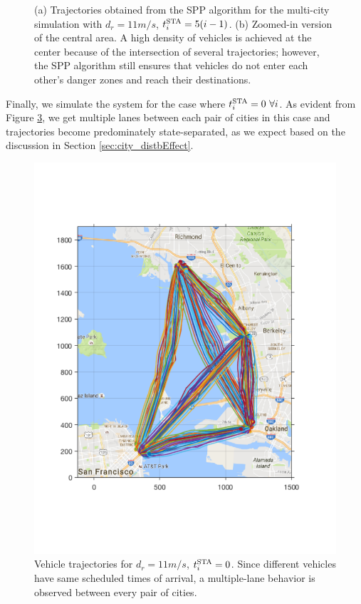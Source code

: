 \begin{figure}[!htb]
\begin{subfigure}{0.5\textwidth}
  \subcaption{}
  \label{fig:bayArea_d11sep5_zoomed}
\end{subfigure}%
  \caption{(a) Trajectories obtained from the SPP algorithm for the multi-city simulation with $d_r = 11m/s$, $t^\text{STA}_i = 5(i-1)$. (b) Zoomed-in version of the central area. A high density of vehicles is achieved at the center because of the intersection of several trajectories; however, the SPP algorithm still ensures that vehicles do not enter each other's danger zones and reach their destinations.} 
  \label{fig:bayArea_d11sep5_all}
\end{figure}

Finally, we simulate the system for the case where $t^\text{STA}_i = 0 ~\forall i$. As evident from Figure \ref{fig:bayArea_d11sep0}, we get multiple lanes between each pair of cities in this case and trajectories become predominately state-separated, as we expect based on the discussion in Section \ref{sec:city_distbEffect}.
\begin{figure}[t]
  \centering
  \includegraphics[width=\columnwidth]{figs/bayArea_d11sep0}
  \caption{Vehicle trajectories for $d_r = 11m/s$, $t^\text{STA}_i = 0$. Since different vehicles have same scheduled times of arrival, a multiple-lane behavior is observed between every pair of cities.} 
  \label{fig:bayArea_d11sep0}
\end{figure}

